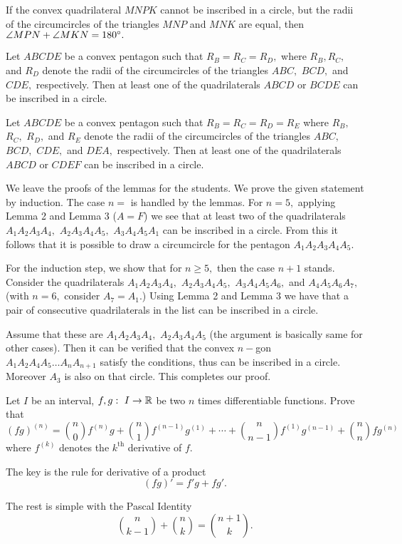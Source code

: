 \documentclass{article}
\begin{document}
\begin{lemma*}[Lemma 1]
    If the convex quadrilateral $MNPK$ cannot be inscribed in a circle, but the radii of the circumcircles of the triangles $MNP$ and $MNK$ are equal,
    then $\angle MPN + \angle MKN = 180^\circ.$
\end{lemma*}

\begin{lemma*}[Lemma 2]
    Let $ABCDE$ be a convex pentagon such that $R_B = R_C = R_D,$ where $R_B, R_C,$ and $R_D$ denote the radii of the circumcircles of the triangles $ABC,$ $BCD,$ and $CDE,$ respectively.
    Then at least one of the quadrilaterals $ABCD$ or $BCDE$ can be inscribed in a circle.
\end{lemma*}

\begin{lemma*}[Lemma 3]
    Let $ABCDE$ be a convex pentagon such that $R_B = R_C = R_D = R_E$ where $R_B,$ $R_C,$ $R_D,$ and $R_E$
    denote the radii of the circumcircles of the triangles $ABC,$ $BCD,$ $CDE,$ and $DEA,$ respectively.
    Then at least one of the quadrilaterals $ABCD$ or $CDEF$ can be inscribed in a circle.
\end{lemma*}

\begin{soln}
    We leave the proofs of the lemmas for the students. We prove the given statement by induction.
    The case $n=$ is handled by the lemmas. For $n=5,$ applying Lemma 2 and Lemma 3 ($A=F$) we see that at least two of the quadrilaterals
    $A_1A_2A_3A_4,$ $A_2A_3A_4A_5,$ $A_3A_4A_5A_1$ can be inscribed in a circle.
    From this it follows that it is possible to draw a circumcircle for the pentagon $A_1A_2A_3A_4A_5.$
    
    For the induction step, we show that for $n \ge 5,$ then the case $n+1$ stands.
    Consider the quadrilaterals $A_1A_2A_3A_4,$ $A_2A_3A_4A_5,$ $A_3A_4A_5A_6,$ and  $A_4A_5A_6A_7,$ (with $n=6,$ consider $A_7=A_1$.)
    Using Lemma 2 and Lemma 3 we have that a pair of consecutive quadrilaterals in the list can be inscribed in a circle.

    Assume that these are $A_1A_2A_3A_4,$ $A_2A_3A_4A_5$ (the argument is basically same for other cases).
    Then it can be verified that the convex $n-$gon $A_1 A_2 A_4 A_5 \ldots A_n A_{n+1}$ satisfy the conditions, thus can be inscribed in a circle.
    Moreover $A_3$ is also on that circle. This completes our proof.
\end{soln}

\begin{problem}
    Let $I$ be an interval, $f,g:\ I \rightarrow \mathbb R$ be two $n$ times differentiable functions. Prove that
    \[
        (fg)^{(n)} = \binom{n}{0}f^{(n)}g + \binom{n}{1}f^{(n-1)}g^{(1)} + \cdots + \binom{n}{n-1}f^{(1)}g^{(n-1)} + \binom{n}{n}fg^{(n)}
    \]
    where $f^{(k)}$ denotes the $k^{\text{th}}$ derivative of $f.$
\end{problem}

\begin{soln}
    The key is the rule for derivative of a product
    \[
        (fg)' = f'g + fg'.
    \]

    The rest is simple with the Pascal Identity
    \[
        \binom{n}{k-1} + \binom{n}{k} = \binom{n+1}{k}.
    \]
\end{soln}
\end{document}
